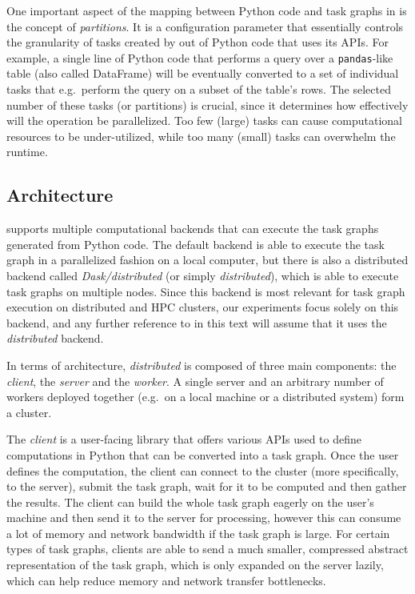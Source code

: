 One important aspect of the mapping between Python code and task graphs in
\dask{} is the concept of \emph{partitions}. It is a configuration
parameter that essentially controls the granularity of tasks created by \dask{}
out of Python code that uses its APIs. For example, a single line of Python code that performs a
query over a \texttt{pandas}-like table (also called DataFrame) will be eventually
converted to a set of individual tasks that e.g.\ perform the query on a subset of the table's
rows. The selected number of these tasks (or partitions) is crucial, since it determines how
effectively will the operation be parallelized. Too few (large) tasks can cause computational
resources to be under-utilized, while too many (small) tasks can overwhelm the
\dask{} runtime.

\subsection*{Architecture}
\dask{} supports multiple computational backends that can execute the task
graphs generated from Python code. The default backend is able to execute the task graph in a
parallelized fashion on a local computer, but there is also a distributed backend called
\emph{Dask/distributed}
(or simply \emph{distributed}), which is able to execute task graphs on
multiple nodes. Since this backend is most relevant for task graph execution on distributed and HPC
clusters, our experiments focus solely on this backend, and any further reference to
\dask{} in this text will assume that it uses the \emph{distributed}
backend.

In terms of architecture, \emph{distributed} is composed of three main components: the
\emph{client}, the \emph{server} and the \emph{worker}. A
single server and an arbitrary number of workers deployed together (e.g.\ on a local machine or a
distributed system) form a \dask{} cluster.

The \emph{client} is a user-facing library that offers various APIs used to define
computations in Python that can be converted into a task graph. Once the user defines the
computation, the client can connect to the \dask{} cluster (more specifically,
to the server), submit the task graph, wait for it to be computed and then gather the results. The
client can build the whole task graph eagerly on the user's machine and then send it to the server
for processing, however this can consume a lot of memory and network bandwidth if the task graph is
large. For certain types of task graphs, clients are able to send a much smaller, compressed
abstract representation of the task graph, which is only expanded on the server lazily, which can
help reduce memory and network transfer bottlenecks.

